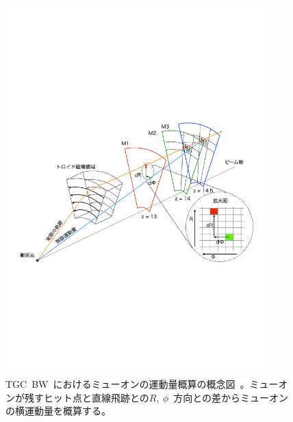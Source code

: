 \begin{figure}[H]
        \centering   
        \includegraphics[width=0.9\textwidth,page=1]{img/pdf/pttgc.pdf}
        \caption[TGC~BW~におけるミューオンの運動量概算の概念図]{TGC~BW~におけるミューオンの運動量概算の概念図~\cite{MT:03}。ミューオンが残すヒット点と直線飛跡との$R,~\phi$~方向との差からミューオンの横運動量を概算する。}
        \label{fig:tgcptt}
\end{figure}

